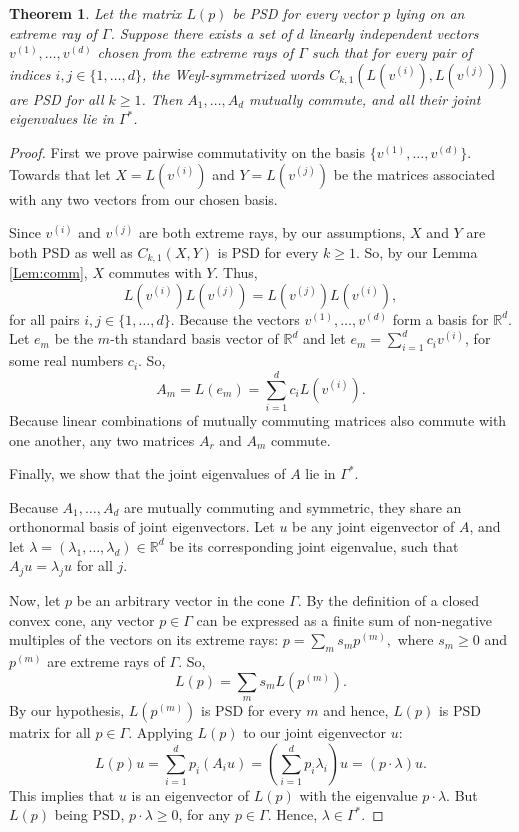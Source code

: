 \documentclass[11pt,reqno]{amsart}
\theoremstyle{plain}
\newtheorem{theorem}{Theorem}[section]
\theoremstyle{definition}
\numberwithin{equation}{section}
\begin{document}
\begin{theorem}\label{Thm:operator-CM}
    Let the matrix $L(p)$ be PSD for every vector $p$ lying on an extreme ray of $\Gamma$. Suppose there exists a set of $d$ linearly independent vectors $v^{(1)}, \dots, v^{(d)}$ chosen from the extreme rays of $\Gamma$ such that for every pair of indices $i, j \in \{1, \dots, d\}$, the Weyl-symmetrized words $C_{k, 1}(L(v^{(i)}), L(v^{(j)}))$ are PSD for all $k \ge 1$. Then $A_1, \dots, A_d$ mutually commute, and all their joint eigenvalues lie in $\Gamma^*$.
\end{theorem}
\begin{proof}
First we prove pairwise commutativity on the basis $\{v^{(1)},\dots, v^{(d)}\}.$
Towards that let $X = L(v^{(i)})$ and $Y = L(v^{(j)})$ be the matrices associated with any two vectors from our chosen basis.

Since $v^{(i)}$ and $v^{(j)}$ are both extreme rays, by our assumptions, $X$ and $Y$ are both PSD as well as $C_{k, 1}(X, Y)$ is PSD for every $k\geq 1$. So, by our Lemma \ref{Lem:comm}, $X$ commutes with $Y$. Thus,
$$
L(v^{(i)}) L(v^{(j)}) = L(v^{(j)}) L(v^{(i)}),
$$
for all pairs $i, j \in \{1, \dots, d\}$.
Because the vectors $v^{(1)}, \dots, v^{(d)}$ form a basis for $\mathbb{R}^d$. Let $e_m$ be the $m$-th standard basis vector of $\mathbb{R}^d$ and let
$e_m = \sum_{i=1}^d c_i v^{(i)}$, for some real numbers $c_i$.
So,
$$
A_m = L(e_m) = \sum_{i=1}^d c_i L(v^{(i)}).
$$
Because linear combinations of mutually commuting matrices also commute with one another, any two matrices $A_r$ and $A_m$ commute.

Finally, we show that the joint eigenvalues of $A$ lie in $\Gamma^*$.

Because $A_1, \dots, A_d$ are mutually commuting and symmetric, they share an orthonormal basis of joint eigenvectors. Let $u$ be any joint eigenvector of $A$, and let $\lambda = (\lambda_1, \dots, \lambda_d) \in \mathbb{R}^d$ be its corresponding joint eigenvalue, such that $A_j u = \lambda_j u$ for all $j$.

Now, let $p$ be an arbitrary vector in the cone $\Gamma$.
By the definition of a closed convex cone, any vector $p \in \Gamma$ can be expressed as a finite sum of non-negative multiples of the vectors on its extreme rays:
$p = \sum_{m} s_m p^{(m)},$ where $s_m \ge 0$ and $p^{(m)}$ are extreme rays of $\Gamma$. So,
$$
L(p) = \sum_{m} s_m L(p^{(m)}).
$$
By our hypothesis, $L(p^{(m)})$ is PSD for every $m$ and hence, $L(p)$ is PSD matrix for all $p \in \Gamma$. Applying $L(p)$ to our joint eigenvector $u$:
$$
L(p)u = \sum_{i=1}^d p_i (A_i u) = \left( \sum_{i=1}^d p_i \lambda_i \right) u = ( p \cdot \lambda) u.
$$
This implies that $u$ is an eigenvector of $L(p)$ with the eigenvalue $ p\cdot \lambda$.
But $L(p)$ being PSD, $p \cdot \lambda \geq 0$, for any $p \in \Gamma$. Hence, $\lambda \in \Gamma^*$.
\end{proof}
\end{document}
